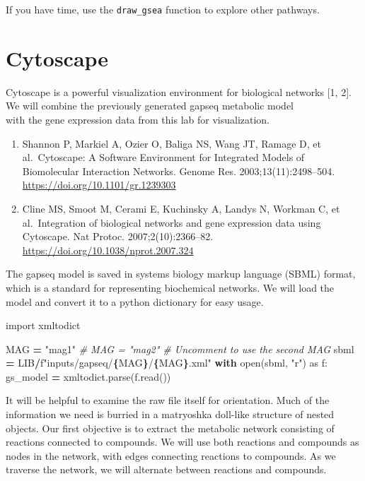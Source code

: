 \documentclass[
]{book}
\newenvironment{Shaded}{\begin{snugshade}}{\end{snugshade}}
\newcommand{\BuiltInTok}[1]{#1}
\newcommand{\CommentTok}[1]{\textcolor[rgb]{0.56,0.35,0.01}{\textit{#1}}}
\newcommand{\ControlFlowTok}[1]{\textcolor[rgb]{0.13,0.29,0.53}{\textbf{#1}}}
\newcommand{\ImportTok}[1]{#1}
\newcommand{\NormalTok}[1]{#1}
\newcommand{\OperatorTok}[1]{\textcolor[rgb]{0.81,0.36,0.00}{\textbf{#1}}}
\newcommand{\SpecialCharTok}[1]{\textcolor[rgb]{0.81,0.36,0.00}{\textbf{#1}}}
\newcommand{\SpecialStringTok}[1]{\textcolor[rgb]{0.31,0.60,0.02}{#1}}
\newcommand{\StringTok}[1]{\textcolor[rgb]{0.31,0.60,0.02}{#1}}
\providecommand{\tightlist}{%
  \setlength{\itemsep}{0pt}\setlength{\parskip}{0pt}}
\begin{document}
If you have time, use the \texttt{draw\_gsea} function to explore other pathways.

\section{Cytoscape}\label{cytoscape}

Cytoscape is a powerful visualization environment for biological networks {[}1, 2{]}. We will combine the previously generated gapseq metabolic model\\
with the gene expression data from this lab for visualization.

\begin{enumerate}
\def\labelenumi{\arabic{enumi}.}
\tightlist
\item
  Shannon P, Markiel A, Ozier O, Baliga NS, Wang JT, Ramage D, et al.~Cytoscape: A Software Environment for Integrated Models of Biomolecular Interaction Networks. Genome Res. 2003;13(11):2498--504. \url{https://doi.org/10.1101/gr.1239303}
\item
  Cline MS, Smoot M, Cerami E, Kuchinsky A, Landys N, Workman C, et al.~Integration of biological networks and gene expression data using Cytoscape. Nat Protoc. 2007;2(10):2366--82. \url{https://doi.org/10.1038/nprot.2007.324}
\end{enumerate}

The gapseq model is saved in systems biology markup language (SBML) format, which is a standard for representing biochemical networks.
We will load the model and convert it to a python dictionary for easy usage.

\begin{Shaded}
\begin{Highlighting}[numbers=left,,]
\ImportTok{import}\NormalTok{ xmltodict}

\NormalTok{MAG }\OperatorTok{=} \StringTok{"mag1"}
\CommentTok{\# MAG = "mag2"  \# Uncomment to use the second MAG}
\NormalTok{sbml }\OperatorTok{=}\NormalTok{ LIB}\OperatorTok{/}\SpecialStringTok{f"inputs/gapseq/}\SpecialCharTok{\{}\NormalTok{MAG}\SpecialCharTok{\}}\SpecialStringTok{/}\SpecialCharTok{\{}\NormalTok{MAG}\SpecialCharTok{\}}\SpecialStringTok{.xml"}
\ControlFlowTok{with} \BuiltInTok{open}\NormalTok{(sbml, }\StringTok{"r"}\NormalTok{) }\ImportTok{as}\NormalTok{ f:}
\NormalTok{    gs\_model }\OperatorTok{=}\NormalTok{ xmltodict.parse(f.read())}
\end{Highlighting}
\end{Shaded}

It will be helpful to examine the raw file itself for orientation. Much of the information we need is burried in a matryoshka doll-like
structure of nested objects. Our first objective is to extract the metabolic network consisting of reactions connected to compounds.
We will use both reactions and compounds as nodes in the network, with edges connecting reactions to compounds. As we traverse the network,
we will alternate between reactions and compounds.
\end{document}
